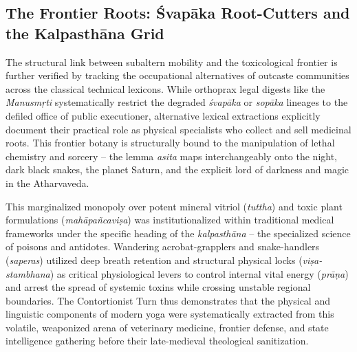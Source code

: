 \documentclass[11pt,twoside,letterpaper]{article}
\begin{document}
\subsection{The Frontier Roots: Śvapāka Root-Cutters and the Kalpasthāna Grid}
The structural link between subaltern mobility and the toxicological frontier is further verified by tracking the occupational alternatives of outcaste communities across the classical technical lexicons. While orthoprax legal digests like the \textit{Manusmṛti} systematically restrict the degraded \textit{śvapāka} or \textit{sopāka} lineages to the defiled office of public executioner, alternative lexical extractions explicitly document their practical role as physical specialists who collect and sell medicinal roots. This frontier botany is structurally bound to the manipulation of lethal chemistry and sorcery – the lemma \textit{asita} maps interchangeably onto the night, dark black snakes, the planet Saturn, and the explicit lord of darkness and magic in the Atharvaveda.

This marginalized monopoly over potent mineral vitriol (\textit{tuttha}) and toxic plant formulations (\textit{mahāpañcaviṣa}) was institutionalized within traditional medical frameworks under the specific heading of the \textit{kalpasthāna} – the specialized science of poisons and antidotes. Wandering acrobat-grapplers and snake-handlers (\textit{saperas}) utilized deep breath retention and structural physical locks (\textit{viṣa-stambhana}) as critical physiological levers to control internal vital energy (\textit{prāṇa}) and arrest the spread of systemic toxins while crossing unstable regional boundaries. The Contortionist Turn thus demonstrates that the physical and linguistic components of modern yoga were systematically extracted from this volatile, weaponized arena of veterinary medicine, frontier defense, and state intelligence gathering before their late-medieval theological sanitization.
\end{document}
